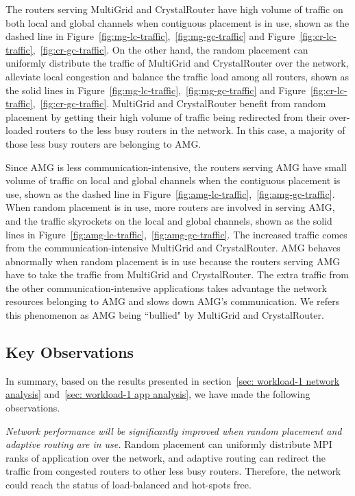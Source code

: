 The routers serving MultiGrid and CrystalRouter have high volume of traffic on both local and global channels when contiguous placement is in use, 
shown as the dashed line in Figure~\ref{fig:mg-lc-traffic},~\ref{fig:mg-gc-traffic} and Figure~\ref{fig:cr-lc-traffic},~\ref{fig:cr-gc-traffic}. 
On the other hand, the random placement can uniformly distribute the traffic of MultiGrid and CrystalRouter over the network, 
alleviate local congestion and balance the traffic load among all routers, 
shown as the solid lines in Figure~\ref{fig:mg-lc-traffic},~\ref{fig:mg-gc-traffic} and Figure~\ref{fig:cr-lc-traffic},~\ref{fig:cr-gc-traffic}. 
MultiGrid and CrystalRouter benefit from random placement by getting their high volume of traffic being redirected 
from their over-loaded routers to the less busy routers in the network. 
In this case, a majority of those less busy routers are belonging to AMG.


Since AMG is less communication-intensive, 
the routers serving AMG have small volume of traffic on local and global channels when the contiguous placement is use, 
shown as the dashed line in Figure~\ref{fig:amg-lc-traffic},~\ref{fig:amg-gc-traffic}. 
When random placement is in use, 
more routers are involved in serving AMG, 
and the traffic skyrockets on the local and global channels, 
shown as the solid lines in Figure~\ref{fig:amg-lc-traffic},~\ref{fig:amg-gc-traffic}. 
The increased traffic comes from the communication-intensive MultiGrid and CrystalRouter. 
AMG behaves abnormally when random placement is in use 
because the routers serving AMG have to take the traffic from MultiGrid and CrystalRouter. 
The extra traffic from the other communication-intensive applications 
takes advantage the network resources belonging to AMG and slows down AMG's communication. 
We refers this phenomenon as AMG being ``bullied" by MultiGrid and CrystalRouter.



\subsection{Key Observations}
In summary, based on the results presented in section~\ref{sec: workload-1 network analysis} and~\ref{sec: workload-1 app analysis}, we have made the following observations.


\emph{Network performance will be significantly improved when random placement and adaptive routing are in use.} 
Random placement can uniformly distribute MPI ranks of application over the network, 
and adaptive routing can redirect the traffic from congested routers to other less busy routers. 
Therefore, the network could reach the status of load-balanced and hot-spots free. 


